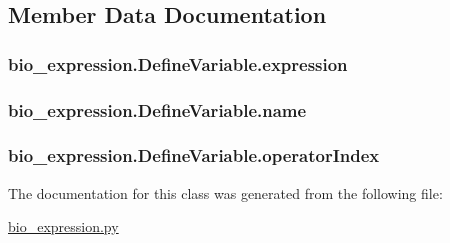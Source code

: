 \subsection{Member Data Documentation}
\hypertarget{classbio__expression_1_1_define_variable_a06ba185542aaef35a3ed57c92b427126}{
\subsubsection[{expression}]{\setlength{\rightskip}{0pt plus 5cm}bio\+\_\+expression.\+Define\+Variable.\+expression}}\label{classbio__expression_1_1_define_variable_a06ba185542aaef35a3ed57c92b427126}
\hypertarget{classbio__expression_1_1_define_variable_ad6fbc0e163c5cd0a76e0d86960d831a7}{
\subsubsection[{name}]{\setlength{\rightskip}{0pt plus 5cm}bio\+\_\+expression.\+Define\+Variable.\+name}}\label{classbio__expression_1_1_define_variable_ad6fbc0e163c5cd0a76e0d86960d831a7}
\hypertarget{classbio__expression_1_1_define_variable_a4f43782aed1e3a2fdf23b75480952cd5}{
\subsubsection[{operator\+Index}]{\setlength{\rightskip}{0pt plus 5cm}bio\+\_\+expression.\+Define\+Variable.\+operator\+Index}}\label{classbio__expression_1_1_define_variable_a4f43782aed1e3a2fdf23b75480952cd5}


The documentation for this class was generated from the following file\+:\begin{DoxyCompactItemize}
\item 
\hyperlink{bio__expression_8py}{bio\+\_\+expression.\+py}\end{DoxyCompactItemize}
